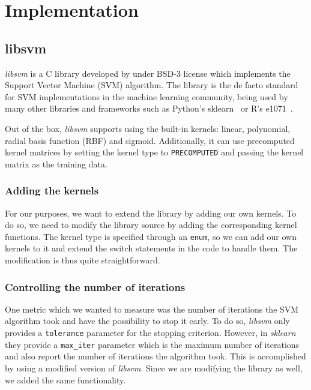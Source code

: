 \section{Implementation}

\subsection{libsvm}

\emph{libsvm} is a C library developed by \textcite{CC01a} under BSD-3 license which implements the
Support Vector Machine (SVM) algorithm. The library is the de facto standard for SVM implementations in
the machine learning community, being used by many other libraries and frameworks such as
Python's sklearn~\cite{ScikitlearnScikitlearn2023} or R's e1071~\cite{meyer[autE1071MiscFunctions2023}.

Out of the box, \emph{libsvm} supports using the built-in kernels: linear, polynomial,
radial basis function (RBF) and sigmoid. Additionally, it can use precomputed kernel matrices
by setting the kernel type to \texttt{PRECOMPUTED} and passing the kernel matrix as the
training data.

\subsubsection{Adding the kernels}

For our purposes, we want to extend the library by adding our own kernels. To do so, we
need to modify the library source by adding the corresponding kernel functions. The kernel
type is specified through an \texttt{enum}, so we can add our own kernels to it and extend the
switch statements in the code to handle them. The modification is thus quite straightforward.

\subsubsection{Controlling the number of iterations}

One metric which we wanted to measure was the number of iterations the SVM algorithm took
and have the possibility to stop it early. To do so, \emph{libsvm} only provides a
\texttt{tolerance} parameter for the stopping criterion. However, in \emph{sklearn}
they provide a \texttt{max\_iter} parameter which is the maximum number of iterations
and also report the number of iterations the algorithm took. This is accomplished by 
using a modified version of \emph{libsvm}. Since we are modifying the library as well,
we added the same functionality.

